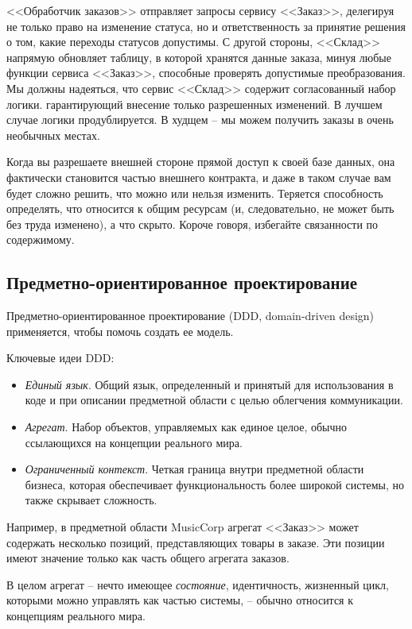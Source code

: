 \documentclass[%
	11pt,
	a4paper,
	utf8,
		]{article}
\begin{document}
<<Обработчик заказов>> отправляет запросы сервису <<Заказ>>, делегируя не только право на изменение статуса, но и ответственность за принятие решения о том, какие переходы статусов допустимы. С другой стороны, <<Склад>> напрямую обновляет таблицу, в которой хранятся данные заказа, минуя любые функции сервиса <<Заказ>>, способные проверять допустимые преобразования. Мы должны надеяться, что сервис <<Склад>> содержит согласованный набор логики. гарантирующий внесение только разрешенных изменений. В лучшем случае логики продублируется. В худщем -- мы можем получить заказы в очень необычных местах.

Когда вы разрешаете внешней стороне прямой доступ к своей базе данных, она фактически становится частью внешнего контракта, и даже в таком случае вам будет сложно решить, что можно или нельзя изменить. Теряется способность определять, что относится к общим ресурсам (и, следовательно, не может быть без труда изменено), а что скрыто. Короче говоря, избегайте связанности по содержимому.

\subsection{Предметно-ориентированное проектирование}

Предметно-ориентированное проектирование (DDD, domain-driven design) применяется, чтобы помочь создать ее модель.

Ключевые идеи DDD:
\begin{itemize}
	\item \emph{Единый язык}. Общий язык, определенный и принятый для использования в коде и при описании предметной области с целью облегчения коммуникации.
	
	\item \emph{Агрегат}. Набор объектов, управляемых как единое целое, обычно ссылающихся на концепции реального мира.
	
	\item \emph{Ограниченный контекст}. Четкая граница внутри предметной области бизнеса, которая обеспечивает функциональность более широкой системы, но также скрывает сложность.
\end{itemize}

Например, в предметной области MusicCorp агрегат <<Заказ>> может содержать несколько позиций, представляющих товары в заказе. Эти позиции имеют значение только как часть общего агрегата заказов.

В целом агрегат -- нечто имеющее \emph{состояние}, идентичность, жизненный цикл, которыми можно управлять как частью системы, -- обычно относится к концепциям реального мира.
\end{document}
